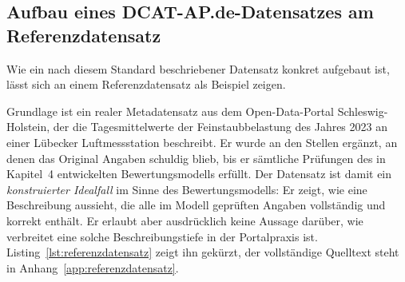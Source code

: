 \subsection{Aufbau eines DCAT-AP.de-Datensatzes am Referenzdatensatz}
\label{sec:referenzdatensatz}

Wie ein nach diesem Standard beschriebener Datensatz konkret aufgebaut ist, lässt sich an einem Referenzdatensatz als Beispiel zeigen.

Grundlage ist ein realer Metadatensatz aus dem Open-Data-Portal Schleswig-Holstein, der die Tagesmittelwerte der Feinstaubbelastung des Jahres 2023 an einer Lübecker Luftmessstation beschreibt. Er wurde an den Stellen ergänzt, an denen das Original Angaben schuldig blieb, bis er sämtliche Prüfungen des in Kapitel~4 entwickelten Bewertungsmodells erfüllt. Der Datensatz ist damit ein \emph{konstruierter Idealfall} im Sinne des Bewertungsmodells: Er zeigt, wie eine Beschreibung aussieht, die alle im Modell geprüften Angaben vollständig und korrekt enthält. Er erlaubt aber ausdrücklich keine Aussage darüber, wie verbreitet eine solche Beschreibungstiefe in der Portalpraxis ist. Listing~\ref{lst:referenzdatensatz} zeigt ihn gekürzt, der vollständige Quelltext steht in Anhang~\ref{app:referenzdatensatz}.

